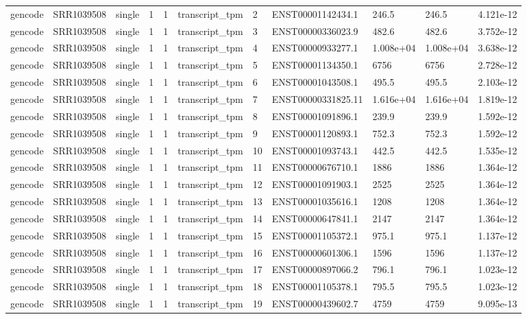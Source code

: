 \begin{tabular}{lllllllllll}
gencode & SRR1039508 & single & 1 & 1 & transcript\_tpm & 2 & ENST00001142434.1 & 246.5 & 246.5 & 4.121e-12 \\
gencode & SRR1039508 & single & 1 & 1 & transcript\_tpm & 3 & ENST00000336023.9 & 482.6 & 482.6 & 3.752e-12 \\
gencode & SRR1039508 & single & 1 & 1 & transcript\_tpm & 4 & ENST00000933277.1 & 1.008e+04 & 1.008e+04 & 3.638e-12 \\
gencode & SRR1039508 & single & 1 & 1 & transcript\_tpm & 5 & ENST00001134350.1 & 6756 & 6756 & 2.728e-12 \\
gencode & SRR1039508 & single & 1 & 1 & transcript\_tpm & 6 & ENST00001043508.1 & 495.5 & 495.5 & 2.103e-12 \\
gencode & SRR1039508 & single & 1 & 1 & transcript\_tpm & 7 & ENST00000331825.11 & 1.616e+04 & 1.616e+04 & 1.819e-12 \\
gencode & SRR1039508 & single & 1 & 1 & transcript\_tpm & 8 & ENST00001091896.1 & 239.9 & 239.9 & 1.592e-12 \\
gencode & SRR1039508 & single & 1 & 1 & transcript\_tpm & 9 & ENST00001120893.1 & 752.3 & 752.3 & 1.592e-12 \\
gencode & SRR1039508 & single & 1 & 1 & transcript\_tpm & 10 & ENST00001093743.1 & 442.5 & 442.5 & 1.535e-12 \\
gencode & SRR1039508 & single & 1 & 1 & transcript\_tpm & 11 & ENST00000676710.1 & 1886 & 1886 & 1.364e-12 \\
gencode & SRR1039508 & single & 1 & 1 & transcript\_tpm & 12 & ENST00001091903.1 & 2525 & 2525 & 1.364e-12 \\
gencode & SRR1039508 & single & 1 & 1 & transcript\_tpm & 13 & ENST00001035616.1 & 1208 & 1208 & 1.364e-12 \\
gencode & SRR1039508 & single & 1 & 1 & transcript\_tpm & 14 & ENST00000647841.1 & 2147 & 2147 & 1.364e-12 \\
gencode & SRR1039508 & single & 1 & 1 & transcript\_tpm & 15 & ENST00001105372.1 & 975.1 & 975.1 & 1.137e-12 \\
gencode & SRR1039508 & single & 1 & 1 & transcript\_tpm & 16 & ENST00000601306.1 & 1596 & 1596 & 1.137e-12 \\
gencode & SRR1039508 & single & 1 & 1 & transcript\_tpm & 17 & ENST00000897066.2 & 796.1 & 796.1 & 1.023e-12 \\
gencode & SRR1039508 & single & 1 & 1 & transcript\_tpm & 18 & ENST00001105378.1 & 795.5 & 795.5 & 1.023e-12 \\
gencode & SRR1039508 & single & 1 & 1 & transcript\_tpm & 19 & ENST00000439602.7 & 4759 & 4759 & 9.095e-13 \\

\end{tabular}
